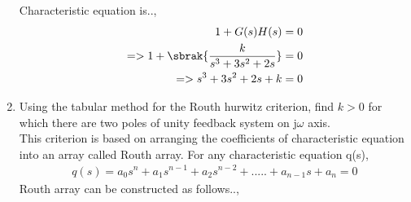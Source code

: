 \begin{enumerate}[label=\thesection.\arabic*.,ref=\thesection.\theenumi]
Characteristic equation is..,
\begin{align}
 1 + G(s)H(s) = 0 \label{eq:sec_order_op}
\\
=> 1 + \sbrak{\frac{k}{s^3+3s^2+2s}} = 0
\\
=> s^3+3s^2+2s+k = 0
\end{align}
\item Using the tabular method for the Routh hurwitz criterion, find $k > 0$ for which there are two poles of unity feedback system on j${\omega}$ axis.
%
\\
\solution 
This criterion is based on arranging the coefficients of characteristic equation into an array called Routh array.
For any characteristic equation q(s),
\begin{align}
q(s) = a_0s^n+a_1s^{n-1}+a_2s^{n-2}+.....+a_{n-1}s+a_n = 0
\end{align}
Routh array can be constructed as follows..,
 

\end{enumerate}
